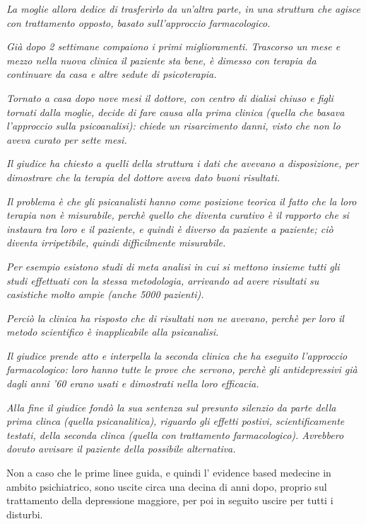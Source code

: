 \documentclass[]{article}
\begin{document}
\emph{La moglie allora dedice di trasferirlo da un'altra parte, in una
struttura che agisce con trattamento opposto, basato sull'approccio
farmacologico.}

\emph{Già dopo 2 settimane compaiono i primi miglioramenti. Trascorso un
mese e mezzo nella nuova clinica il paziente sta bene, è dimesso con
terapia da continuare da casa e altre sedute di psicoterapia.}

\emph{Tornato a casa dopo nove mesi il dottore, con centro di dialisi
chiuso e figli tornati dalla moglie, decide di fare causa alla prima
clinica (quella che basava l'approccio sulla psicoanalisi): chiede un
risarcimento danni, visto che non lo aveva curato per sette mesi.}

\emph{Il giudice ha chiesto a quelli della struttura i dati che avevano
a disposizione, per dimostrare che la terapia del dottore aveva dato
buoni risultati.}

\emph{Il problema è che gli psicanalisti hanno come posizione teorica il
fatto che la loro terapia non è misurabile, perchè quello che diventa
curativo è il rapporto che si instaura tra loro e il paziente, e quindi
è diverso da paziente a paziente; ciò diventa irripetibile, quindi
difficilmente misurabile.}

\emph{Per esempio esistono studi di meta analisi in cui si mettono
insieme tutti gli studi effettuati con la stessa metodologia, arrivando
ad avere risultati su casistiche molto ampie (anche 5000 pazienti).}

\emph{Perciò la clinica ha risposto che di risultati non ne avevano,
perchè per loro il metodo scientifico è inapplicabile alla psicanalisi.}

\emph{Il giudice prende atto e interpella la seconda clinica che ha
eseguito l'approccio farmacologico: loro hanno tutte le prove che
servono, perchè gli antidepressivi già dagli anni '60 erano usati e
dimostrati nella loro efficacia.}

\emph{Alla fine il giudice fondò la sua sentenza sul presunto silenzio
da parte della prima clinca (quella psicanalitica), riguardo gli effetti
postivi, scientificamente testati, della seconda clinca (quella con
trattamento farmacologico). Avrebbero dovuto avvisare il paziente della
possibile alternativa.}

Non a caso che le prime linee guida, e quindi l' evidence based medecine
in ambito psichiatrico, sono uscite circa una decina di anni dopo,
proprio sul trattamento della depressione maggiore, per poi in seguito
uscire per tutti i disturbi.
\end{document}
